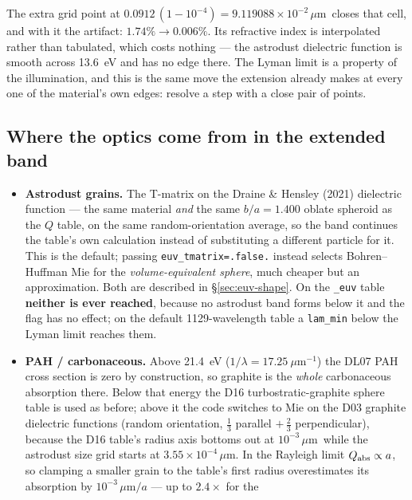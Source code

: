 \documentclass{my_memo}
\newcommand{\code}[1]{\texttt{#1}}
\newcommand{\um}{\ensuremath{\,\mu\mathrm{m}}}
\begin{document}
The extra grid point at $0.0912\,(1-10^{-4}) = 9.119088\times10^{-2}$\um\ closes
that cell, and with it the artifact: $1.74\% \to 0.006\%$. Its refractive index
is interpolated rather than tabulated, which costs nothing --- the astrodust
dielectric function is smooth across \SI{13.6}{\electronvolt} and has no edge
there. The Lyman limit is a property of the illumination, and this is the same
move the extension already makes at every one of the material's own edges:
resolve a step with a close pair of points.

\subsection{Where the optics come from in the extended band}

\begin{itemize}
\item \textbf{Astrodust grains.} The T-matrix on the Draine \& Hensley (2021)
      dielectric function --- the same material \emph{and} the same $b/a =
      1.400$ oblate spheroid as the $Q$ table, on the same random-orientation
      average, so the band continues the table's own calculation instead of
      substituting a different particle for it. This is the default; passing
      \code{euv\_tmatrix=.false.} instead selects Bohren--Huffman Mie for the
      \emph{volume-equivalent sphere}, much cheaper but an approximation.
      Both are described in \S\ref{sec:euv-shape}. On the \code{\_euv} table
      \textbf{neither is ever reached}, because no astrodust band forms below
      it and the flag has no effect; on the default 1129-wavelength table a
      \code{lam\_min} below the Lyman limit reaches them.
\item \textbf{PAH / carbonaceous.} Above \SI{21.4}{\electronvolt}
      ($1/\lambda = 17.25\ \mu\mathrm{m}^{-1}$) the DL07 PAH cross section is
      zero by construction, so graphite is the \emph{whole} carbonaceous
      absorption there. Below that energy the D16 turbostratic-graphite sphere
      table is used as before; above it the code switches to Mie on the D03
      graphite dielectric functions (random orientation, $\tfrac13$ parallel
      $+\,\tfrac23$ perpendicular), because the D16 table's radius axis bottoms
      out at $10^{-3}$\um\ while the astrodust size grid starts at
      $3.55\times10^{-4}$\um. In the Rayleigh limit $Q_{\rm abs}\propto a$, so
      clamping a smaller grain to the table's first radius overestimates its
      absorption by $10^{-3}\,\mu\mathrm{m}/a$ --- up to $2.4\times$ for the

\end{itemize}
\end{document}
